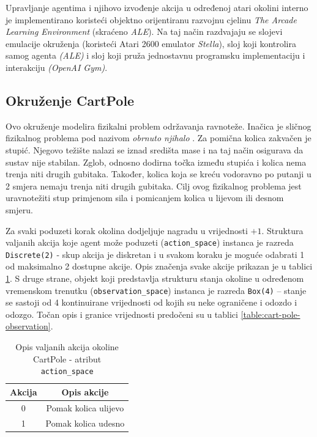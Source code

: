 Upravljanje agentima i njihovo izvođenje akcija u određenoj atari okolini interno je implementirano koristeći objektno orijentiranu razvojnu cjelinu  \textit{The Arcade Learning Environment} (skraćeno \textit{ALE}). Na taj način razdvajaju se slojevi emulacije okruženja (koristeći Atari 2600 emulator \textit{Stella}), sloj koji kontrolira samog agenta \textit{(ALE)} i sloj koji pruža jednostavnu programsku implementaciju i interakciju \textit{(OpenAI Gym)}\cite{OpenAIALE}. 


\subsection{Okruženje CartPole}

Ovo okruženje modelira fizikalni problem održavanja ravnoteže. Inačica je sličnog fizikalnog problema pod nazivom \textit{obrnuto njihalo} . Za pomična kolica zakvačen je stupić. Njegovo težište nalazi se iznad središta mase i na taj način osigurava da sustav nije stabilan.  Zglob, odnosno dodirna točka između stupića i kolica nema trenja niti drugih gubitaka. Također, kolica koja se kreću vodoravno po putanji u 2 smjera nemaju trenja niti drugih gubitaka. Cilj ovog fizikalnog problema jest uravnotežiti stup primjenom sila i pomicanjem kolica u lijevom ili desnom smjeru.

Za svaki poduzeti korak okolina dodjeljuje nagradu u vrijednosti $+1$. Struktura valjanih akcija koje agent može poduzeti (\texttt{action_space}) instanca je razreda \texttt{Discrete(2)} - skup akcija je diskretan i u svakom koraku je moguće odabrati 1 od maksimalno 2 dostupne akcije. Opis značenja svake akcije prikazan je u tablici \ref{table:cart-pole-action}. S druge strane, objekt koji predstavlja strukturu stanja okoline u određenom vremenskom trenutku (\texttt{observation_space}) instanca je razreda \texttt{Box(4)} – stanje se sastoji od 4 kontinuirane vrijednosti od kojih su neke ograničene i odozdo i odozgo. Točan opis i granice vrijednosti predočeni su u tablici \ref{table:cart-pole-observation}.

\begin{table}[ht]
    \centering
    \caption{Opis valjanih akcija okoline CartPole - atribut \texttt{action_space}}
    \begin{tabular}{c c}
        \hline
        Akcija & Opis akcije  \\
        \hline
        0 & Pomak kolica ulijevo \\
        1 & Pomak kolica udesno \\ 
    \end{tabular}
    \label{table:cart-pole-action}
\end{table}

